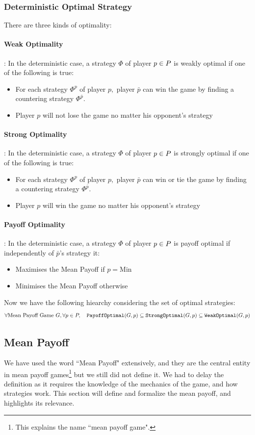 \subsubsection{Deterministic Optimal Strategy}
There are three kinds of optimality:
\paragraph{Weak Optimality}: In the deterministic case, a strategy $\Phi$ of player $p\in P$ is weakly optimal if one of the following is true:
\begin{itemize}
	\item For each strategy $\Phi^{p}$ of player $p,$ player $\bar{p}$ can win the game by finding a countering strategy $\Phi^{\bar{p}}.$
	\item Player $p$ will not lose the game no matter his opponent's strategy
\end{itemize}

\paragraph{Strong Optimality}: In the deterministic case, a strategy $\Phi$ of player $p\in P$ is strongly optimal if one of the following is true:
\begin{itemize}
	\item For each strategy $\Phi^{p}$ of player $p,$ player $\bar{p}$ can win or tie the game by finding a countering strategy $\Phi^{\bar{p}}.$
	\item Player $p$ will win the game no matter his opponent's strategy
\end{itemize}

\paragraph{Payoff Optimality}: In the deterministic case, a strategy $\Phi$ of player $p\in P$ is payoff optimal if independently of $\bar{p}$'s strategy it:
\begin{itemize}
	\item Maximises the Mean Payoff if $p=\text{Min}$ 
	\item Minimises the Mean Payoff otherwise
\end{itemize}
Now we have the following hiearchy considering the set of optimal strategies:
$$
\forall \text{Mean Payoff Game}\ G,\forall p\in P,\quad \operatorname{\mathtt{PayoffOptimal}}(G,p) \subseteq \operatorname{\mathtt{StrongOptimal}}(G,p) \subseteq \operatorname{\mathtt{WeakOptimal}}(G,p)
$$
\subsection{Mean Payoff}
\label{section:Formalisation:MeanPayoff}
We have used the word ``Mean Payoff" extensively, and they are the central entity in mean payoff games\footnote{This explains the name ``mean payoff game".} but we still did not define it.
\newline We had to delay the definition as it requires the knowledge of the mechanics of the game, and how strategies work. This section will define and formalize the mean payoff, and highlights its relevance.
